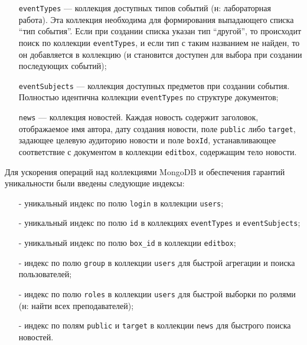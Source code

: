 \documentclass[14pt]{extarticle}
\begin{document}
\begin{enumerate}
\item[] \texttt{eventTypes} --- коллекция доступных типов событий (н: лабораторная работа). Эта коллекция необходима для формирования выпадающего списка \enquote{тип события}. Если при создании списка указан тип \enquote{другой}, то происходит поиск по коллекции \texttt{eventTypes}, и если тип с таким названием не найден, то он добавляется в коллекцию (и становится доступен для выбора при создании последующих событий);
\item[] \texttt{eventSubjects} --- коллекция доступных предметов при создании события. Полностью идентична коллекции \texttt{eventTypes} по структуре документов;
\item[] \texttt{news} --- коллекция новостей. Каждая новость содержит заголовок, отображаемое имя автора, дату создания новости, поле \texttt{public} либо \texttt{target}, задающее целевую аудиторию новости и поле \texttt{boxId}, устанавливающее соответствие с документом в коллекции \texttt{editbox}, содержащим тело новости.
\end{enumerate}

Для ускорения операций над коллекциями MongoDB и обеспечения гарантий уникальности были введены следующие индексы:
\begin{enumerate}
\item[-] уникальный индекс по полю \texttt{login} в коллекции \texttt{users};
\item[-] уникальный индекс по полю \texttt{id} в коллекциях \texttt{eventTypes} и \texttt{eventSubjects};
\item[-] уникальный индекс по полю \texttt{box\_id} в коллекции \texttt{editbox};
\item[-] индекс по полю \texttt{group} в коллекции \texttt{users} для быстрой агрегации и поиска пользователей;
\item[-] индекс по полю \texttt{roles} в коллекции \texttt{users} для быстрой выборки по ролями (н: найти всех преподавателей);
\item[-] индекс по полям \texttt{public} и \texttt{target} в коллекции \texttt{news} для быстрого поиска новостей.
\end{enumerate}
\end{document}
